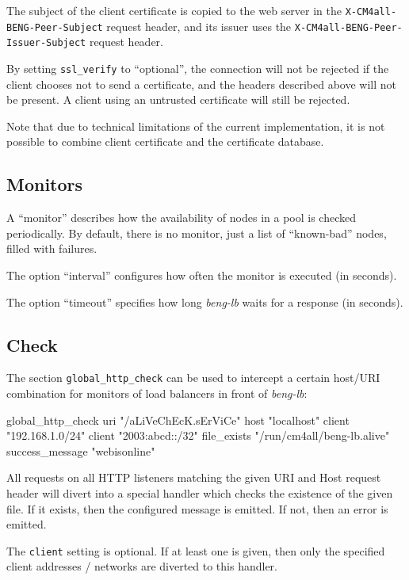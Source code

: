 \documentclass[a4paper,12pt]{article}
\begin{document}
The subject of the client certificate is copied to the web server in
the \verb|X-CM4all-BENG-Peer-Subject| request header, and its issuer
uses the \verb|X-CM4all-BENG-Peer-Issuer-Subject| request header.

By setting \verb|ssl_verify| to ``optional'', the connection will not
be rejected if the client chooses not to send a certificate, and the
headers described above will not be present.  A client using an
untrusted certificate will still be rejected.

Note that due to technical limitations of the current implementation,
it is not possible to combine client certificate and the certificate
database.

\subsection{Monitors}

A ``monitor'' describes how the availability of nodes in a pool is
checked periodically.  By default, there is no monitor, just a list of
``known-bad'' nodes, filled with failures.

The option ``interval'' configures how often the monitor is executed
(in seconds).

The option ``timeout'' specifies how long \emph{beng-lb} waits for a
response (in seconds).

\subsection{Check}

The section \verb|global_http_check| can be used to intercept a
certain host/URI combination for monitors of load balancers in front
of \emph{beng-lb}:

\begin{verbatim*}
global_http_check {
  uri "/aLiVeChEcK.sErViCe"
  host "localhost"
  client "192.168.1.0/24"
  client "2003:abcd::/32"
  file_exists "/run/cm4all/beng-lb.alive"
  success_message "webisonline"
}
\end{verbatim*}

All requests on all HTTP listeners matching the given URI and Host
request header will divert into a special handler which checks the
existence of the given file.  If it exists, then the configured
message is emitted.  If not, then an error is emitted.

The \verb|client| setting is optional.  If at least one is given, then
only the specified client addresses / networks are diverted to this
handler.
\end{document}
